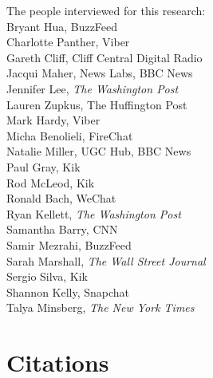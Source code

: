 \documentclass[notoc, symmetric, nobib, nols]{towcenter-guideto-book}
\newcommand{\blankpage}{\newpage\hbox{}\thispagestyle{empty}\newpage}
\begin{document}
The people interviewed for this research:\\
\vspace{\baselineskip}
Bryant Hua, BuzzFeed\\
Charlotte Panther, Viber\\
Gareth Cliff, Cliff Central Digital Radio\\
Jacqui Maher, News Labs, BBC News\\
Jennifer Lee, \textit{The Washington Post}\\
Lauren Zupkus, The Huffington Post\\
Mark Hardy, Viber\\
Micha Benolieli, FireChat\\
Natalie Miller, UGC Hub, BBC News\\
Paul Gray, Kik\\
Rod McLeod, Kik\\
Ronald Bach, WeChat\\
Ryan Kellett, \textit{The Washington Post}\\
Samantha Barry, CNN\\
Samir Mezrahi, BuzzFeed\\
Sarah Marshall, \textit{The Wall Street Journal}\\
Sergio Silva, Kik\\
Shannon Kelly, Snapchat\\
Talya Minsberg, \textit{The New York Times}\\

\chapter{Citations}
\blankpage
\theendnotes
\end{document}
